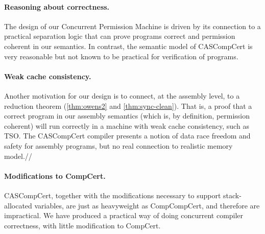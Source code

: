 
\paragraph{Reasoning about correctness.} The design of our Concurrent Permission Machine is driven by its connection to a practical separation logic that can prove programs correct and permission coherent in our semantics. In contrast, the semantic model of CASCompCert is very reasonable but not known to be practical for verification of programs. 

\paragraph{Weak cache consistency.} Another motivation for our design is to connect, at the assembly level, to a reduction theorem (\autoref{thm:owens2} and \autoref{thm:sync-clean}). That is, a proof that a correct program in our assembly semantics (which is, by definition, permission coherent) will run correctly in a machine with weak cache consistency, such as TSO. The CASCompCert compiler presents a notion of data race freedom and safety for assembly programs, but no real connection to realistic memory model.//

\paragraph{Modifications to CompCert.} CASCompCert, together with the modifications necessary to support stack-allocated variables, are just as heavyweight as CompCompCert, and therefore are impractical. We have produced a practical way of doing concurrent compiler correctness, with little modification to CompCert.

